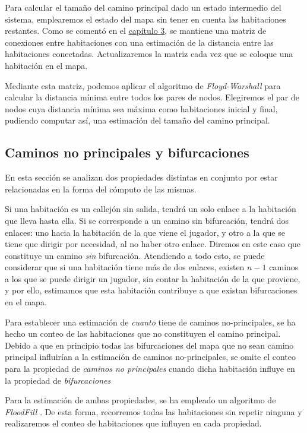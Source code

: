 Para calcular el tamaño del camino principal dado un estado intermedio del sistema, emplearemos el estado del mapa sin tener en cuenta las habitaciones restantes. Como se comentó en el \hyperref[uppermatsec]{capítulo 3}, se mantiene una matriz de conexiones entre habitaciones con una estimación de la distancia entre las habitaciones conectadas. Actualizaremos la matriz cada vez que se coloque una habitación en el mapa.

Mediante esta matriz, podemos aplicar el algoritmo de \emph{Floyd-Warshall} \cite{floydwarshall}para calcular la distancia mínima entre todos los pares de nodos. Elegiremos el par de nodos cuya distancia mínima sea máxima como habitaciones inicial y final, pudiendo computar así, una estimación del tamaño del camino principal.

\subsection{Caminos no principales y bifurcaciones}

En esta sección se analizan dos propiedades distintas en conjunto por estar relacionadas en la forma del cómputo de las mismas.


Si una habitación es un callejón sin salida, tendrá un solo enlace a la habitación que lleva hasta ella. Si se corresponde a un camino sin bifurcación, tendrá dos enlaces: uno hacia la habitación de la que viene el jugador, y otro a la que se tiene que dirigir por necesidad, al no haber otro enlace. Diremos en este caso que constituye un camino \emph{sin} bifurcación. Atendiendo a todo esto, se puede considerar que si una habitación tiene más de dos enlaces, existen $n-1$ caminos a los que se puede dirigir un jugador, sin contar la habitación de la que proviene, y por ello, estimamos que esta habitación contribuye a que existan bifurcaciones en el mapa.

Para establecer una estimación de \emph{cuanto} tiene de caminos no-principales, se ha hecho un conteo de las habitaciones que no constituyen el camino principal. Debido a que en principio todas las bifurcaciones del mapa que no sean camino principal influirían a la estimación de caminos no-principales, se omite el conteo para la propiedad de \emph{caminos no principales} cuando dicha habitación influye en la propiedad de \emph{bifurcaciones}

Para la estimación de ambas propiedades, se ha empleado un algoritmo de \emph{FloodFill} \cite{floodfill}. De esta forma, recorremos todas las habitaciones sin repetir ninguna y realizaremos el conteo de habitaciones que influyen en cada propiedad.


